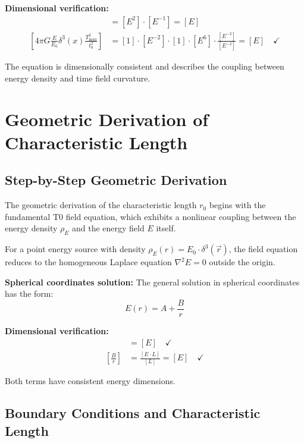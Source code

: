 \documentclass[12pt,a4paper]{report}
\newcommand{\rzero}{r_0}                  %
\newcommand{\tzero}{t_0}                  %
\begin{document}
\textbf{Dimensional verification:}
\begin{align}
	[\nabla^2 T_{\text{field}}] &= [E^2] \cdot [E^{-1}] = [E] \\
	\left[4\pi G \frac{E}{E_0} \delta^3(x) \frac{T_{\text{field}}^2}{\tzero^2}\right] &= [1] \cdot [E^{-2}] \cdot [1] \cdot [E^6] \cdot \frac{[E^{-2}]}{[E^{-2}]} = [E] \quad \checkmark
\end{align}

The equation is dimensionally consistent and describes the coupling between energy density and time field curvature.

\section{Geometric Derivation of Characteristic Length}
\label{sec:geometric_derivation}

\subsection{Step-by-Step Geometric Derivation}
\label{subsec:geometric_derivation_steps}

The geometric derivation of the characteristic length $\rzero$ begins with the fundamental T0 field equation, which exhibits a nonlinear coupling between the energy density $\rho_E$ and the energy field $E$ itself.

For a point energy source with density $\rho_E(r) = E_0 \cdot \delta^3(\vec{r})$, the field equation reduces to the homogeneous Laplace equation $\nabla^2 E = 0$ outside the origin.

\textbf{Spherical coordinates solution:}
The general solution in spherical coordinates has the form:
\begin{equation}
	E(r) = A + \frac{B}{r}
	\label{eq:general_solution}
\end{equation}

\textbf{Dimensional verification:}
\begin{align}
	[A] &= [E] \quad \checkmark \\
	\left[\frac{B}{r}\right] &= \frac{[E \cdot L]}{[L]} = [E] \quad \checkmark
\end{align}

Both terms have consistent energy dimensions.

\subsection{Boundary Conditions and Characteristic Length}
\label{subsec:boundary_conditions}
\end{document}

